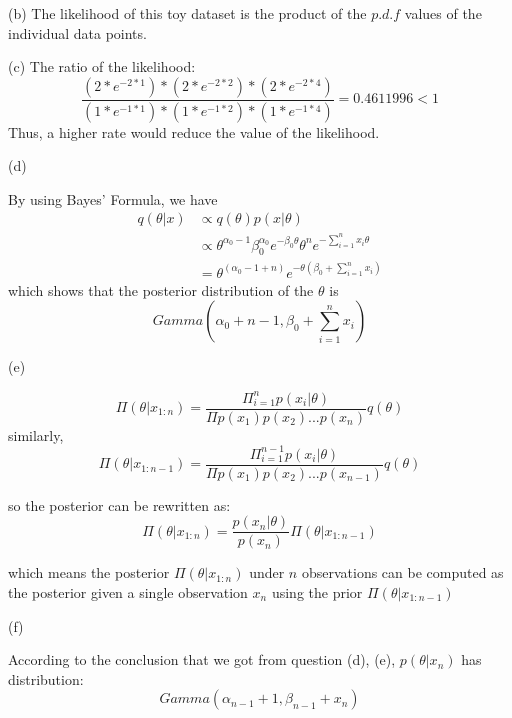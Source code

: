 \documentclass[10pt]{article}
\begin{document}
(b)
The likelihood of this toy dataset is the product of the $p.d.f$ values of the individual data points.


(c)
The  ratio  of  the  likelihood: 
$$\frac{(2*e^{-2*1})*(2*e^{-2*2})*(2*e^{-2*4})}{(1*e^{-1*1})*(1*e^{-1*2})*(1*e^{-1*4})}=0.4611996<1$$
Thus, a higher rate would reduce the value of the likelihood.


(d)


By using Bayes' Formula, we have
\begin{align}
q(\theta \vert x)&\propto q(\theta)p(x\vert \theta) \nonumber\\
&\propto \theta^{\alpha_0-1}\beta_0^{\alpha_0}e^{-\beta_0\theta}\theta^{n}e^{-\sum_{i=1}^{n}x_i\theta}\nonumber\\
&=\theta^{(\alpha_0-1+n)}e^{-\theta(\beta_0+\sum_{i=1}^{n}x_i)}\nonumber
\end{align}
which shows that the posterior distribution of the $\theta$ is
$$Gamma(\alpha_0+n-1,\beta_0+\sum_{i=1}^{n}x_i)$$


(e)


$$\Pi(\theta\vert x_{1:n})=\frac{\Pi_{i=1}^{n}p(x_i\vert \theta)}{\Pi p(x_1)p(x_2)...p(x_n)}q(\theta)$$
similarly, $$\Pi(\theta\vert x_{1:n-1})=\frac{\Pi_{i=1}^{n-1}p(x_i\vert \theta)}{\Pi p(x_1)p(x_2)...p(x_{n-1})}q(\theta)$$

so the posterior can be rewritten as:
$$\Pi(\theta\vert x_{1:n})=\frac{p(x_n\vert\theta)}{p(x_n)}\Pi(\theta\vert x_{1:n-1})$$

which means the posterior $\Pi(\theta\vert x_{1:n})$ under $n$ observations can be computed as the posterior given a single observation $x_n$ using the prior $\Pi(\theta\vert x_{1:n-1})$
 
 
 (f)
 
 
 According to the conclusion that we got from question (d), (e), 
 $p(\theta\vert x_n)$ has distribution: $$Gamma(\alpha_{n-1}+1,\beta_{n-1}+x_n)$$

 
 
 
 
\end{document}
